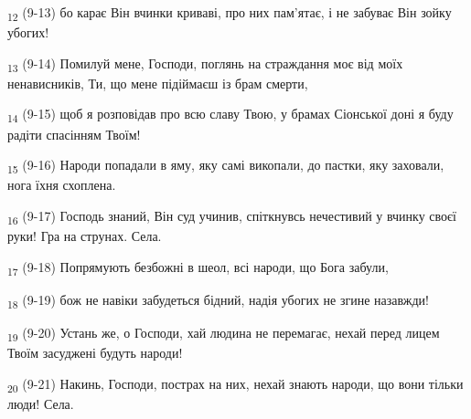 \begin{tcolorbox}
\textsubscript{12} (9-13) бо карає Він вчинки криваві, про них пам'ятає, і не забуває Він зойку убогих!
\end{tcolorbox}
\begin{tcolorbox}
\textsubscript{13} (9-14) Помилуй мене, Господи, поглянь на страждання моє від моїх ненависників, Ти, що мене підіймаєш із брам смерти,
\end{tcolorbox}
\begin{tcolorbox}
\textsubscript{14} (9-15) щоб я розповідав про всю славу Твою, у брамах Сіонської доні я буду радіти спасінням Твоїм!
\end{tcolorbox}
\begin{tcolorbox}
\textsubscript{15} (9-16) Народи попадали в яму, яку самі викопали, до пастки, яку заховали, нога їхня схоплена.
\end{tcolorbox}
\begin{tcolorbox}
\textsubscript{16} (9-17) Господь знаний, Він суд учинив, спіткнувсь нечестивий у вчинку своєї руки! Гра на струнах. Села.
\end{tcolorbox}
\begin{tcolorbox}
\textsubscript{17} (9-18) Попрямують безбожні в шеол, всі народи, що Бога забули,
\end{tcolorbox}
\begin{tcolorbox}
\textsubscript{18} (9-19) бож не навіки забудеться бідний, надія убогих не згине назавжди!
\end{tcolorbox}
\begin{tcolorbox}
\textsubscript{19} (9-20) Устань же, о Господи, хай людина не перемагає, нехай перед лицем Твоїм засуджені будуть народи!
\end{tcolorbox}
\begin{tcolorbox}
\textsubscript{20} (9-21) Накинь, Господи, пострах на них, нехай знають народи, що вони тільки люди! Села.
\end{tcolorbox}
